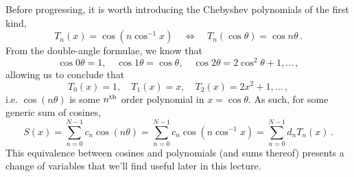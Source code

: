 Before progressing, it is worth introducing the Chebyshev polynomials
of the first kind,
%
\begin{displaymath}
  T_n(x) = \cos\left(n\cos^{-1}x\right) \quad\Longleftrightarrow\quad
  T_n(\cos \theta) = \cos n\theta \,.
\end{displaymath}
%
From the double-angle formulae, we know that
%
\begin{displaymath}
  \cos 0\theta = 1, \quad \cos 1\theta = \cos\theta, \quad \cos 2\theta = 2\cos^2\theta + 1, \hdots \,,
\end{displaymath}
%
allowing us to conclude that
%
\begin{displaymath}
  T_0(x) = 1, \quad T_1(x) = x, \quad T_2(x) = 2x^2 + 1, \hdots \,,
\end{displaymath}
%
i.e. $\cos(n\theta)$ is some $n^\mathrm{th}\mkern1mu$ order polynomial in $x = \cos\theta$.
As such, for some generic sum of cosines,
%
\begin{displaymath}
  S(x) = \sum_{n=0}^{N-1} c_n\cos(n\theta)
  = \sum_{n=0}^{N-1}c_n\cos(n\cos^{-1}x)
  = \sum_{n=0}^{N-1} d_nT_n(x) \,.
\end{displaymath}
%
This equivalence between cosines and polynomials (and sums thereof) presents
a change of variables that we'll find useful later in this lecture.

